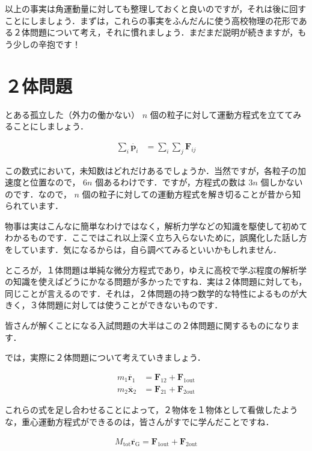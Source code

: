 \documentclass[
  b4paperpaper,
  xelatex,ja=standard]{bxjsbook}
\begin{document}
以上の事実は角運動量に対しても整理しておくと良いのですが，それは後に回すことにしましょう．まずは，これらの事実をふんだんに使う高校物理の花形である２体問題について考え，それに慣れましょう．まだまだ説明が続きますが，もう少しの辛抱です！

\hypertarget{ux4f53ux554fux984c}{%
\section{２体問題}\label{ux4f53ux554fux984c}}

とある孤立した（外力の働かない） \(n\)
個の粒子に対して運動方程式を立ててみることにしましょう．

\begin{align*}
\sum_i \dot{\boldsymbol{p}_i} &= \sum_i\sum_j \boldsymbol{F}_{ij}
\end{align*}

この数式において，未知数はどれだけあるでしょうか．当然ですが，各粒子の加速度と位置なので，
\(6n\) 個あるわけです．ですが，方程式の数は \(3n\)
個しかないのです．なので， \(n\)
個の粒子に対しての運動方程式を解き切ることが昔から知られています．


物事は実はこんなに簡単なわけではなく，解析力学などの知識を駆使して初めてわかるものです．ここではこれ以上深く立ち入らないために，誤魔化した話し方をしています．気になるからは，自ら調べてみるといいかもしれません．

ところが，１体問題は単純な微分方程式であり，ゆえに高校で学ぶ程度の解析学の知識を使えばどうにかなる問題が多かったですね．実は２体問題に対しても，同じことが言えるのです．それは，２体問題の持つ数学的な特性によるものが大きく，３体問題に対しては使うことができないものです．

皆さんが解くことになる入試問題の大半はこの２体問題に関するものになります．

では，実際に２体問題について考えていきましょう．

\begin{align*}
m_1 \ddot{\boldsymbol{r}_1} &= \boldsymbol{F}_{12} +\boldsymbol{F}_{1\text{out}}\\
m_2 \ddot{\boldsymbol{x}_2} &= \boldsymbol{F}_{21} +\boldsymbol{F}_{2\text{out}}
\end{align*}

これらの式を足し合わせることによって，２物体を１物体として看做したような，重心運動方程式ができるのは，皆さんがすでに学んだことですね．

\begin{align*}
M_{\text{tot}} \ddot{\boldsymbol{r}_{\text{G}}} = \boldsymbol{F}_{1\text{out}}+\boldsymbol{F}_{2\text{out}}
\end{align*}
\end{document}
